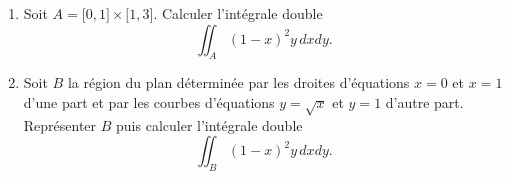 
\begin{exercice}\label{exoOutilsMath-0149}

    \begin{enumerate}
        \item
            Soit \( A=\mathopen[ 0 , 1 \mathclose]\times \mathopen[ 1 , 3 \mathclose]\). Calculer l'intégrale double
            \begin{equation}
                \iint_A(1-x)^2y\,dxdy.
            \end{equation}
        \item
            Soit \( B\) la région du plan déterminée par les droites d'équations \( x=0\) et \( x=1\) d'une part et par les courbes d'équations \( y=\sqrt{x}\) et \( y=1\) d'autre part. Représenter \( B\) puis calculer l'intégrale double
            \begin{equation}
                \iint_{B}(1-x)^2y\,dxdy.
            \end{equation}
    \end{enumerate}

\end{exercice}
